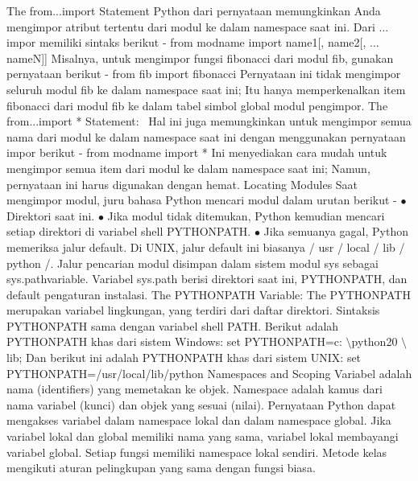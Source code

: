 The $  $from...import $  $Statement  
Python dari pernyataan memungkinkan Anda mengimpor atribut tertentu dari modul ke dalam namespace saat ini. Dari ... impor memiliki sintaks berikut -
 \hspace*{0.5in} from modname import name1[, name2[, ... nameN]]
Misalnya, untuk mengimpor fungsi fibonacci dari modul fib, gunakan pernyataan berikut - 
 \hspace*{0.5in} from fib import fibonacci
Pernyataan ini tidak mengimpor seluruh modul fib ke dalam namespace saat ini; Itu hanya memperkenalkan item fibonacci dari modul fib ke dalam tabel simbol global modul pengimpor. 
The $  $from...import * $  $Statement: \
Hal ini juga memungkinkan untuk mengimpor semua nama dari modul ke dalam namespace saat ini dengan menggunakan pernyataan impor berikut - 
 \hspace*{0.5in} from modname import *
Ini menyediakan cara mudah untuk mengimpor semua item dari modul ke dalam namespace saat ini; Namun, pernyataan ini harus digunakan dengan hemat.
Locating Modules
Saat mengimpor modul, juru bahasa Python mencari modul dalam urutan berikut -
 \hspace*{0.5in}  $ \bullet $ Direktori saat ini. 
 \hspace*{0.5in}  $ \bullet $ Jika modul tidak ditemukan, Python kemudian mencari setiap direktori di variabel shell  \hspace*{0.5in} PYTHONPATH.
 \hspace*{0.5in}  $ \bullet $ Jika semuanya gagal, Python memeriksa jalur default. Di UNIX, jalur default ini  \hspace*{0.5in} biasanya / usr / local / lib / python /. 
Jalur pencarian modul disimpan dalam sistem modul sys sebagai sys.pathvariable. Variabel sys.path berisi direktori saat ini, PYTHONPATH, dan default pengaturan instalasi.
The $  $PYTHONPATH $  $Variable: 
The PYTHONPATH merupakan variabel lingkungan, yang terdiri dari daftar direktori. Sintaksis PYTHONPATH sama dengan variabel shell PATH. 
Berikut adalah PYTHONPATH khas dari sistem Windows:
 \hspace*{0.5in} set PYTHONPATH=c: $  \setminus  $python20 $  \setminus  $lib; 
Dan berikut ini adalah PYTHONPATH khas dari sistem UNIX:
 \hspace*{0.5in} set PYTHONPATH=/usr/local/lib/python 
Namespaces and Scoping 
Variabel adalah nama (identifiers) yang memetakan ke objek. Namespace adalah kamus dari nama variabel (kunci) dan objek yang sesuai (nilai). 
Pernyataan Python dapat mengakses variabel dalam namespace lokal dan dalam namespace global. Jika variabel lokal dan global memiliki nama yang sama, variabel lokal membayangi variabel global. Setiap fungsi memiliki namespace lokal sendiri. Metode kelas mengikuti aturan pelingkupan yang sama dengan fungsi biasa. 
